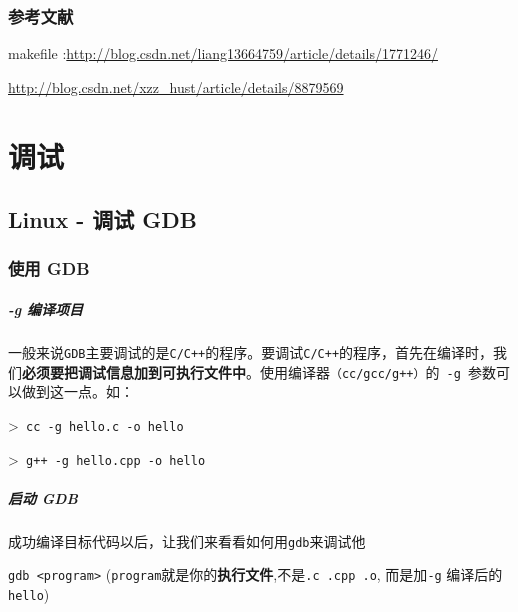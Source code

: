 \documentclass[UTF8,a4paper,12pt]{ctexbook} %
\begin{document}
		\subsection{参考文献}
		
			makefile :\url{http://blog.csdn.net/liang13664759/article/details/1771246/}
			
			\url{http://blog.csdn.net/xzz_hust/article/details/8879569}

\chapter{调试}			
	\section{Linux - 调试 GDB}
		\subsection{使用 GDB}
			\paragraph{-g 编译项目}
				一般来说\verb|GDB|主要调试的是\verb|C/C++|的程序。要调试\verb|C/C++|的程序，首先在编译时，我们\textbf{必须要把调试信息加到可执行文件中}。使用编译器\verb|（cc/gcc/g++）|的\verb| -g |参数可以做到这一点。如：
				
				>\verb| cc -g hello.c -o hello|
				
				>\verb| g++ -g hello.cpp -o hello|
				
			\paragraph{启动 GDB}
				成功编译目标代码以后，让我们来看看如何用\verb|gdb|来调试他
				
				\verb|gdb <program>| (\verb|program|就是你的\textbf{执行文件},不是\verb|.c .cpp .o|, 而是加\verb|-g| 编译后的\verb|hello|)
				
			
\end{document}
